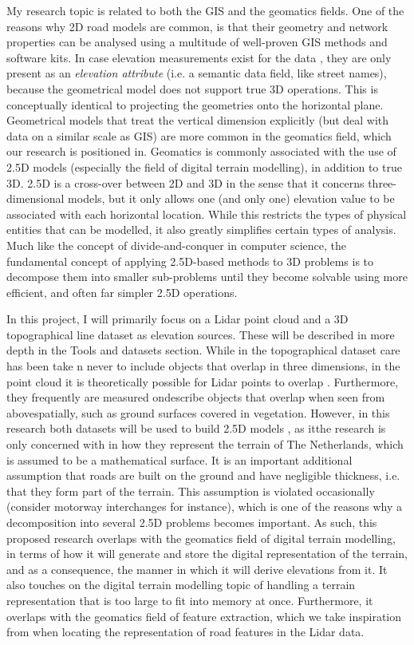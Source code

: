My research topic is related to both the GIS and the geomatics fields. One of the reasons why 2D road models are common, is that their geometry and network properties can be analysed using a multitude of well-proven GIS methods and software kits. In case elevation measurements exist for the data , they are only present as an \textit{elevation attribute} (i.e. a semantic data field, like street names), because the geometrical model does not support true 3D operations. This is conceptually identical to projecting the geometries onto the horizontal plane. Geometrical models that treat the vertical dimension explicitly (but deal with data on a similar scale as GIS) are more common in the geomatics field, which our research is positioned in. Geomatics is commonly associated with the use of 2.5D models (especially the field of digital terrain modelling), in addition to true 3D. 2.5D is a cross-over between 2D and 3D in the sense that it concerns three-dimensional models, but it only allows one (and only one) elevation value to be associated with each horizontal location. While this restricts the types of physical entities that can be modelled, it also greatly simplifies certain types of analysis. Much like the concept of divide-and-conquer in computer science, the fundamental concept of applying 2.5D-based methods to 3D problems is to decompose them into smaller sub-problems until they become solvable using more efficient, and often far simpler 2.5D operations.

In this project, I will primarily focus on a Lidar point cloud and a 3D topographical line dataset as elevation sources. These will be described in more depth in the Tools and datasets section. While in the topographical dataset care has been take n never to include objects that overlap in three dimensions, in the point cloud it is theoretically possible for Lidar points to overlap . Furthermore, they frequently are measured ondescribe objects that overlap when seen from abovespatially, such as ground surfaces covered in vegetation. However, in this research both datasets  will be used to build 2.5D models , as itthe research is only concerned with in how they  represent the terrain of The Netherlands, which is assumed to be a mathematical surface. It is an important additional assumption that roads are built on the ground and have negligible thickness, i.e. that they form part of the terrain. This assumption is violated occasionally (consider motorway interchanges for instance), which is one of the reasons why a decomposition into several 2.5D problems becomes important. As such, this proposed research overlaps with the geomatics field of digital terrain modelling, in terms of how it will generate and store the digital representation of the terrain, and as a consequence, the manner in which it will derive elevations from it. It also touches on the digital terrain modelling topic of handling a terrain representation that is too large to fit into memory at once. Furthermore, it overlaps with the geomatics field of feature extraction, which we take inspiration from when locating the representation of road features in the Lidar data.